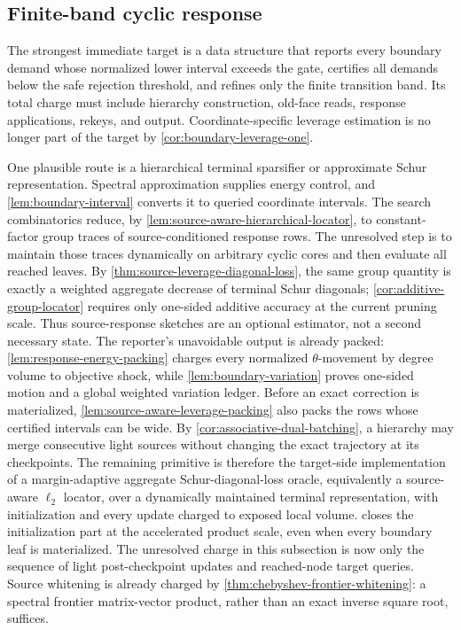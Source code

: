\subsection{Finite-band cyclic response}

The strongest immediate target is a data structure that reports every
boundary demand whose normalized lower interval exceeds the gate, certifies
all demands below the safe rejection threshold, and refines only the finite
transition band.  Its total charge must include hierarchy construction,
old-face reads, response applications, rekeys, and output.  Coordinate-specific
leverage estimation is no longer part of the target by
\cref{cor:boundary-leverage-one}.

One plausible route is a hierarchical terminal sparsifier or approximate Schur
representation.  Spectral approximation supplies energy control, and
\cref{lem:boundary-interval} converts it to queried coordinate intervals.  The
search combinatorics reduce, by
\cref{lem:source-aware-hierarchical-locator}, to constant-factor group traces
of source-conditioned response rows.  The unresolved step is to maintain
those traces dynamically on arbitrary cyclic cores and then evaluate all
reached leaves.  By \cref{thm:source-leverage-diagonal-loss}, the same group
quantity is exactly a weighted aggregate decrease of terminal Schur
diagonals; \cref{cor:additive-group-locator} requires only one-sided additive
accuracy at the current pruning scale.  Thus source-response sketches are an
optional estimator, not a second necessary state.  The reporter's unavoidable
output is already packed:
\cref{lem:response-energy-packing} charges every normalized
$\theta$-movement by degree volume to objective shock, while
\cref{lem:boundary-variation} proves one-sided motion and a global weighted
variation ledger.  Before an exact correction is materialized,
\cref{lem:source-aware-leverage-packing} also packs the rows whose certified
intervals can be wide.  By \cref{cor:associative-dual-batching}, a hierarchy
may merge consecutive light sources without changing the exact trajectory at
its checkpoints.  The remaining primitive is therefore the target-side
implementation of a margin-adaptive aggregate Schur-diagonal-loss oracle,
equivalently a source-aware $\ell_2$ locator, over a dynamically maintained
terminal representation, with initialization and every update charged to
exposed local volume.
 closes the initialization part at
the accelerated product scale, even when every boundary leaf is materialized.
The unresolved charge in this subsection is now only the sequence of light
post-checkpoint updates and reached-node target queries.  Source whitening is
already charged by \cref{thm:chebyshev-frontier-whitening}: a spectral
frontier matrix-vector product, rather than an exact inverse square root,
suffices.

